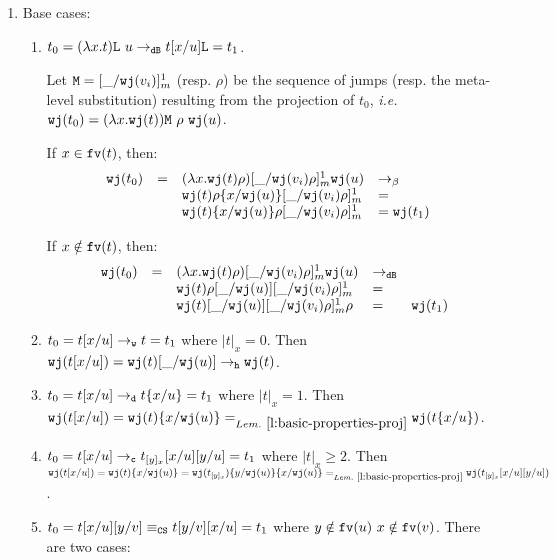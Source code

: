 \documentclass{LMCS}
\newcommand{\ie}{{\it  i.e.}~}
\renewcommand{\>}{\rightarrow}
\def\lam{\lambda}
\newcommand{\Rew}[1]{\rightarrow_{#1}}
\newcommand{\isubs}[1]{ \{ #1  \} }
\newcommand{\B}{{\tt dB}}
\newcommand{\dis}{{\tt j}}
\newcommand{\fv}[1]{{\tt fv}(#1)}
\newcommand{\proj}{\wfc}
\newcommand{\Var}{{\tt d}}
\newcommand{\DSubs}{{\tt c}}
\newcommand{\Gc}{{\tt w}}
\newcommand{\CS}{{\tt CS}}
\newcommand{\wfc}{\Gc\dis}
\newcommand{\slist}{{\tt L}}
\newcommand{\New}{{\tt h}}
\newcommand{\mlist}{{\tt M}}
\newcommand{\void}{\_}
\begin{document}
\proof \hfill
\begin{enumerate}[$\bullet$]
\item Base cases:
\begin{enumerate}[$-$]
\item $t_0 =  (\lam x.t)\slist\ u  \Rew{\B}  t[x/u]\slist = t_1$.

Let $\mlist = [\void/\proj(v_i)]^1_m$ (resp. $\rho$) be the sequence of jumps
(resp. the meta-level substitution) resulting from the 
projection of $t_0$, \ie\ $\proj(t_0) = (\lam x.\proj(t)) \mlist\ \rho\ \proj(u)$.

If $x \in \fv{t}$, then:
\[\begin{array}{lllll}
\proj(t_0) &=& (\lam x.\proj(t)\rho) [\void/ \proj(v_i) \rho]^1_m  \proj(u)& \Rew{\beta}\\
&& \proj(t)\rho\isubs{x/\proj(u)}   [\void/ \proj(v_i) \rho]^1_m   &=&\\
&& \proj(t)\isubs{x/\proj(u)}\rho   [\void/ \proj(v_i) \rho]^1_m  &= \proj(t_1)
  \end{array} \] 

 

If $x \notin \fv{t}$, then: 
\[\begin{array}{lllll}
\proj(t_0) &= &(\lam x.\proj(t)\rho) [\void/ \proj(v_i) \rho]^1_m \proj(u)& \Rew{\B}\\
&& \proj(t)\rho [\void/\proj(u)] [\void/ \proj(v_i) \rho]^1_m &=&\\ 
            &&\proj(t)[\void/\proj(u)] [\void/ \proj(v_i) \rho]^1_m  \rho &=& 
            \proj(t_1)
\end{array} \] 

\item $t_0 = t[x/u]  \Rew{\Gc}  t= t_1$  where  $|t|_{x}= 0$.  
Then $\proj(t[x/u]) =\proj(t)[\void/\proj(u)] \Rew{\New} \proj(t)$. 
\item  $t_0  =  t[x/u]  \Rew{\Var} t\isubs{x/u}= t_1$  where  $|t|_{x}= 1$.
Then $\proj(t[x/u]) =\proj(t)\isubs{x/\proj(u)} 
=_{Lem.~\ref{l:basic-properties-proj}} \proj(t\isubs{x/u})$.
\item  $t_0 = t[x/u]  \Rew{\DSubs}  t_{[y]_x}[x/u][y/u]= t_1$  where 
$|t|_{x} \geq 2$. Then 
$\proj(t[x/u]) =\proj(t)\isubs{x/\proj(u)} =
                     \proj(t_{[y]_x})\isubs{y/\proj(u)}\isubs{x/\proj(u)} 
=_{Lem.~\ref{l:basic-properties-proj}}
                     \proj(t_{[y]_x}[x/u][y/u])$. 
\item $t_0 = t[x/u][y/v]  \equiv_{\CS}   t[y/v][x/u]= t_1$  where  $y\notin
    \fv{u}\  x\notin    \fv{v}$.
There are two cases:  


\end{enumerate}
\end{enumerate}
\end{document}
